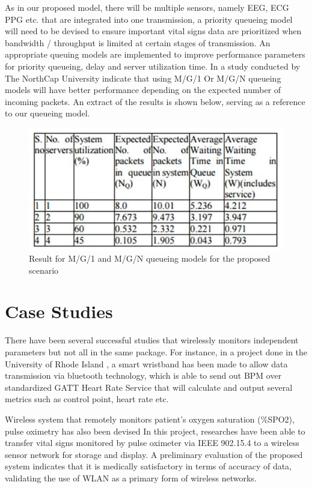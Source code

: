 As in our proposed model, there will be multiple sensors, namely EEG, ECG PPG etc. that are integrated into one transmission, a priority queueing model will need to be devised to ensure important vital signs data are prioritized when bandwidth / throughput is limited at certain stages of transmission. An appropriate queuing models are implemented to improve performance parameters for priority queueing, delay and server utilization time. In a study conducted by The NorthCap University \cite{lit4} indicate that using M/G/1 Or M/G/N queueing models will have better performance depending on the expected number of incoming packets. An extract of the results is shown below, serving as a reference to our queueing model. 

\begin{figure}[H]
	\centering
	\includegraphics[width=0.7\linewidth]{lit3.jpg}
	\caption{Result for M/G/1 and M/G/N queueing models for the proposed scenario \cite{lit4}}
	\label{literaturereview3}
\end{figure}

\section{Case Studies}

There have been several successful studies that wirelessly monitors independent parameters but not all in the same package. For instance, in a project done in the University of Rhode Island \cite{lit3}, a smart wristband has been made to allow data transmission via bluetooth technology, which is able to send out BPM over standardized GATT Heart Rate Service that will calculate and output several metrics such as control point, heart rate etc. 

Wireless system that remotely monitors patient’s oxygen saturation (\%SPO2), pulse oximetry has also been devised \cite{lit5} In this project, researches have been able to transfer vital signs monitored by pulse oximeter via IEEE 902.15.4 to a wireless sensor network for storage and display. A preliminary evaluation of the proposed system indicates that it is medically satisfactory in terms of accuracy of data, validating the use of WLAN as a primary form of wireless networks. 

